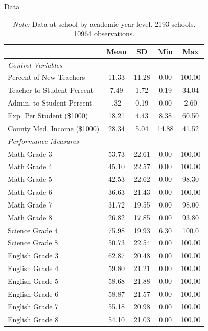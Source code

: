 \documentclass[notes]{beamer}
\begin{document}
\begin{frame}{Data}
\begin{table}[htbp]\centering
\tiny
\def\sym#1{\ifmmode^{#1}\else\(^{#1}\)\fi}
\caption{Summary Statistics, Pennsylvania Department of Education and American Community Survey Data from 2014 to 2018.}
\begin{tabular}{l*{1}{cccc}}
\hline\hline

                    &  Mean&          SD&         Min&         Max\\
\hline
\textit{Control Variables} \\
\hline
\rule{0pt}{4ex}Percent of New Teachers&   11.33&       11.28&        0.00&      100.00\\
Teacher to Student Percent&    7.49&        1.72&        0.19&       34.04\\
Admin. to Student Percent& .32&        0.19&        0.00&        2.60\\
Exp. Per Student (\$1000)&   18.21&     4.43&     8.38&    60.50\\
County Med. Income (\$1000)&    28.34&     5.04&    14.88&    41.52\\
\hline
\textit{Performance Measures} \\
\hline
\rule{0pt}{4ex}Math Grade 3        &     53.73&       22.61&        0.00&      100.00\\
Math Grade 4        &    45.10&       22.57&        0.00&      100.00\\
Math Grade 5        &     42.53&       22.62&        0.00&       98.30\\
Math Grade 6        &    36.63&       21.43&        0.00&      100.00\\
Math Grade 7        &      31.72&       19.55&        0.00&       98.00\\
Math Grade 8        &     26.82&       17.85&        0.00&       93.80\\
Science Grade 4     &      75.98&       19.93&        6.30&      100.0\\
Science Grade 8     &   50.73&       22.54&        0.00&      100.00\\
English Grade 3     &    62.87&       20.48&        0.00&      100.00\\
English Grade 4     &       59.80&       21.21&        0.00&      100.00\\
English Grade 5     &      58.68&       21.88&        0.00&      100.00\\
English Grade 6     &     58.87&       21.57&        0.00&      100.00\\
English Grade 7     & 55.18&       20.98&        0.00&      100.00\\
English Grade 8     &     54.10&       21.03&        0.00&      100.00\\
\hline\hline
\end{tabular}
\caption*{\textit{Note:} Data at school-by-academic year level. 2193 schools. 10964 observations.}
\end{table}
\end{frame}
\end{document}
